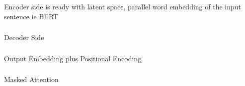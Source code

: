 			
		



			
		


\begin{frame}[fragile]\frametitle{}
\begin{center}
{\Large Encoder side is ready with latent space, parallel word embedding of the input sentence ie BERT}
\end{center}
\end{frame}



\begin{frame}[fragile]\frametitle{}
\begin{center}
{\Large Decoder Side}
\end{center}
\end{frame}

\begin{frame}[fragile]\frametitle{}
\begin{center}
{\Large Output Embedding plus Positional Encoding}
\end{center}
\end{frame}

\begin{frame}[fragile]\frametitle{}
\begin{center}
{\Large Masked Attention}
\end{center}
\end{frame}

